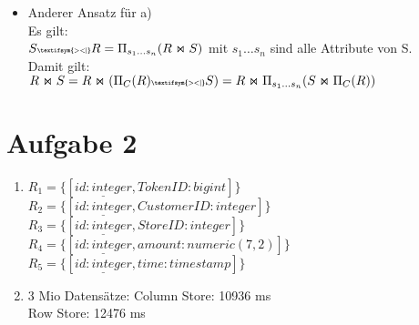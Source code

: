 \documentclass[a4paper]{article}
\newcommand{\RightSemiJoin}{\textbf{\tiny	 \textifsym{><|}}}
\begin{document}
\begin{itemize}
\item 

Anderer Ansatz für a)
\\
Es gilt: \\
$S \RightSemiJoin R = \Pi_{s_1 \ldots s_n}(R \Join S)$ mit $s_1 \ldots s_n$ sind alle Attribute von S.
\\
Damit gilt:
\\
$R \Join S = R \Join  (\Pi_C(R) \RightSemiJoin S) = R \Join \Pi_{s_1 \ldots s_n}(S \Join \Pi_{C}(R)) $





\end{itemize}


\section*{Aufgabe 2}
\begin{enumerate}[label=\alph*)]

\item $R_1=\{[\underline{id:integer}, TokenID:bigint]\}$\\
			$R_2=\{[\underline{id:integer}, CustomerID:integer]\}$\\
			$R_3=\{[\underline{id:integer}, StoreID:integer]\}$\\
			$R_4=\{[\underline{id:integer}, amount:numeric(7,2)]\}$\\
			$R_5=\{[\underline{id:integer}, time:timestamp]\}$
\setcounter{enumi}{5}
\item 3 Mio Datensätze: Column Store: 10936 ms \\
			Row Store: 12476 ms

\end{enumerate}
\end{document}
